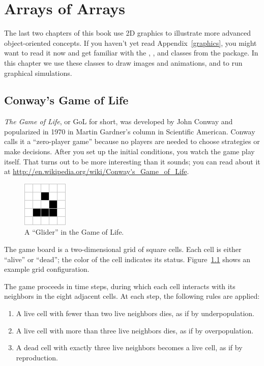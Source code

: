 \chapter{Arrays of Arrays}
\label{conway}

The last two chapters of this book use 2D graphics to illustrate more advanced object-oriented concepts.
If you haven't yet read Appendix~\ref{graphics}, you might want to read it now and get familiar with the , , and  classes from the  package.
In this chapter we use these classes to draw images and animations, and to run graphical simulations.


\section{Conway's Game of Life}

{\it The Game of Life}, or GoL for short, was developed by John Conway and popularized in 1970 in Martin Gardner's column in Scientific American.
Conway calls it a ``zero-player game'' because no players are needed to choose strategies or make decisions.
After you set up the initial conditions, you watch the game play itself.
That turns out to be more interesting than it sounds; you can read about it at \url{http://en.wikipedia.org/wiki/Conway's_Game_of_Life}.

\begin{figure}[!ht]
\begin{center}
\includegraphics{figs/glider.png}
\caption{A ``Glider'' in the Game of Life.}
\label{fig:glider}
\end{center}
\end{figure}

The game board is a two-dimensional grid of square cells.
Each cell is either ``alive'' or ``dead''; the color of the cell indicates its status.
Figure~\ref{fig:glider} shows an example grid configuration.


The game proceeds in time steps, during which each cell interacts with its neighbors in the eight adjacent cells.
At each step, the following rules are applied:

\begin{enumerate}
\small
\item A live cell with fewer than two live neighbors dies, as if by underpopulation.
\item A live cell with more than three live neighbors dies, as if by overpopulation.
\item A dead cell with exactly three live neighbors becomes a live cell, as if by reproduction.
\end{enumerate}

